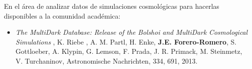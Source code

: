 \noindent 
En el \'area de analizar datos de simulaciones cosmol\'ogicas
para hacerlas disponibles a la comunidad acad\'emica:

\begin{itemize}
\item{\it The MultiDark Database: Release of the Bolshoi and
  MultiDark Cosmological Simulations} , K. Riebe , A. M. Partl,
  H. Enke, {\bf J.E. Forero-Romero}, S. Gottloeber, A. Klypin,
  G. Lemson, F. Prada, J. R. Primack, M. Steinmetz, V. Turchaninov,
  Astronomische Nachrichten, 334, 691, 2013. 
\end{itemize}


